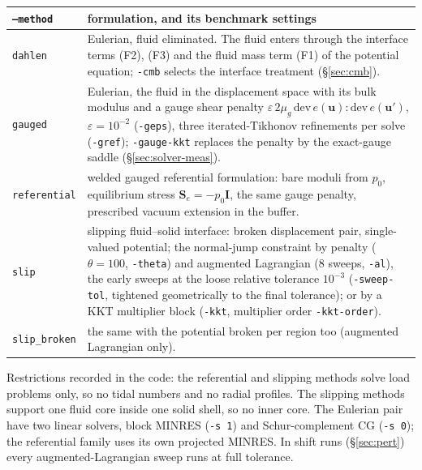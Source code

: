 \documentclass[11pt]{article}
\numberwithin{equation}{section}
\newcommand{\eps}{\varepsilon}
\newcommand{\vu}{\mathbf{u}}
\newcommand{\code}[1]{\texttt{#1}}
\begin{document}
\begin{center}
\small
\begin{tabular}{@{}lP{11.5cm}@{}}
\toprule
\code{--method} & formulation, and its benchmark settings \\
\midrule
\code{dahlen} & Eulerian, fluid eliminated. The fluid enters through the interface terms (F2), (F3) and the fluid mass term (F1) of the potential equation; \code{-cmb} selects the interface treatment (\S\ref{sec:cmb}). \\
\code{gauged} & Eulerian, the fluid in the displacement space with its bulk modulus and a gauge shear penalty $\eps\,2\mu_g\,\mathrm{dev}\,e(\vu):\mathrm{dev}\,e(\vu')$, $\eps=10^{-2}$ (\code{-geps}), three iterated-Tikhonov refinements per solve (\code{-gref}); \code{-gauge-kkt} replaces the penalty by the exact-gauge saddle (\S\ref{sec:solver-meas}). \\
\code{referential} & welded gauged referential formulation: bare moduli from $p_0$, equilibrium stress $\mathbf{S}_e=-p_0\mathbf{I}$, the same gauge penalty, prescribed vacuum extension in the buffer. \\
\code{slip} & slipping fluid--solid interface: broken displacement pair, single-valued potential; the normal-jump constraint by penalty ($\theta=100$, \code{-theta}) and augmented Lagrangian (8 sweeps, \code{-al}), the early sweeps at the loose relative tolerance $10^{-3}$ (\code{-sweep-tol}, tightened geometrically to the final tolerance); or by a KKT multiplier block (\code{-kkt}, multiplier order \code{-kkt-order}). \\
\code{slip\_broken} & the same with the potential broken per region too (augmented Lagrangian only). \\
\bottomrule
\end{tabular}
\end{center}
\noindent Restrictions recorded in the code: the referential and slipping
methods solve load problems only, so no tidal numbers and no radial
profiles. The slipping methods support one fluid core inside one solid
shell, so no inner core. The Eulerian pair have two linear solvers, block
MINRES (\code{-s 1}) and Schur-complement CG (\code{-s 0}); the referential
family uses its own projected MINRES. In shift runs
(\S\ref{sec:pert}) every augmented-Lagrangian sweep runs at full
tolerance.
\end{document}

